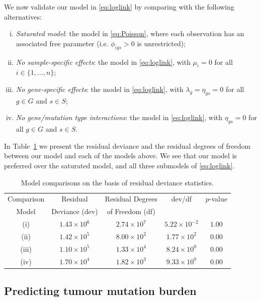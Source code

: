 \documentclass[../thesis.tex]{subfiles}
\begin{document}
We now validate our model in \eqref{eq:loglink} by comparing with the following alternatives: 
\begin{enumerate}[(i)]
\item \emph{Saturated model}: the model in \eqref{eq:Poisson}, where each observation has an associated free parameter (i.e. $\phi_{igs} > 0$ is unrestricted);
\item \emph{No sample-specific effects}: the model in \eqref{eq:loglink}, with $\mu_i = 0$ for all $i \in \{1,\ldots, n\}$;
\item \emph{No gene-specific effects}: the model in \eqref{eq:loglink}, with $\lambda_g = \eta_{gs} = 0$ for all $g \in G$ and $s\in S$; 
\item \emph{No gene/mutation type interactions}: the model in \eqref{eq:loglink}, with $\eta_{gs} =0$ for all $g \in G$ and $s\in S$.
\end{enumerate}

In Table~\ref{table:goodnessoffit} we present the residual deviance and the residual degrees of freedom between our model and each of the models above. We see that our model is preferred over the saturated model, and all three submodels of \eqref{eq:loglink}. 

\begin{table}[ht]
\begin{center}
\caption{Model comparisons on the basis of residual deviance statistics. \label{table:goodnessoffit}}
\begin{tabular}{ | c | c | c | c  | c |}
\hline
Comparison  & Residual  & Residual Degrees & dev/df & $p$-value \\
Model            & Deviance (dev)             & of Freedom (df)  &        &           \\
\hline
(i) & $1.43 \times 10^6$  & $2.74 \times 10^7$  &  $5.22 \times 10^{-2}$  &  $1.00$ \\
\hline
(ii)  & $1.42 \times 10^5$  &  $8.00 \times 10^2$  & $1.77 \times 10^2$ & $0.00$\\
(iii)  &  $1.10 \times 10^5 $ & $1.33 \times 10^4$  & $8.24 \times 10^0$ &  $0.00$\\
(iv) & $1.70 \times 10^4$ & $1.82 \times 10^3$ & $9.33 \times 10^0$ & $0.00$ \\
\hline
\end{tabular}
\vspace*{-10mm}
\end{center}
\end{table}


\subsection{Predicting tumour mutation burden \label{sec:tmb}}
\end{document}
